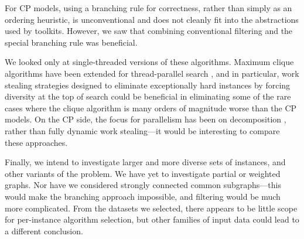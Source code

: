 \documentclass{llncs}
\begin{document}
For CP models, using a branching rule for correctness, rather than simply as an ordering heuristic,
is unconventional and does not cleanly fit into the abstractions used by toolkits. However, we saw
that combining conventional filtering and the special branching rule was beneficial.

We looked only at single-threaded versions of these algorithms. Maximum clique algorithms have been
extended for thread-parallel search
\cite{DBLP:journals/algorithms/McCreeshP13,DBLP:journals/jcisd/DepolliKRTJ13,DBLP:journals/cor/SegundoLP16},
and in particular, work stealing strategies designed to eliminate exceptionally hard instances by
forcing diversity at the top of search \cite{DBLP:journals/topc/McCreeshP15} could be beneficial in
eliminating some of the rare cases where the clique algorithm is many orders of magnitude worse than
the CP models. On the CP side, the focus for parallelism has been on decomposition
\cite{DBLP:conf/ictai/MinotNS15}, rather than fully dynamic work stealing---it would be interesting
to compare these approaches.

Finally, we intend to investigate larger and more diverse sets of instances, and other variants of
the problem. We have yet to investigate partial or weighted graphs. Nor have we considered strongly
connected common subgraphs---this would make the branching approach impossible, and filtering would
be much more complicated. From the datasets we selected, there appears to be little scope for
per-instance algorithm selection, but other families of input data could lead to a different
conclusion.

\citesforrefcheck



\end{document}
